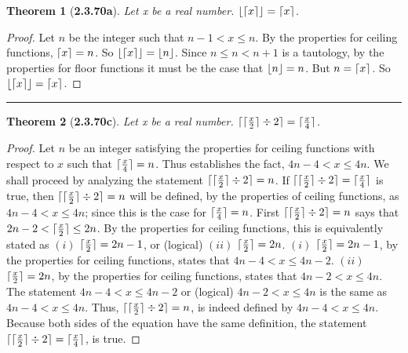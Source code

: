\documentclass[a4paper, 12pt]{article}
\theoremstyle{plain}
\newtheorem*{theorem*}{Theorem}
\DeclarePairedDelimiter{\floor}{\lfloor}{\rfloor}
\DeclarePairedDelimiter{\ceil}{\lceil}{\rceil}
\begin{document}
\pagebreak

\begin{theorem*}[\textbf{2.3.70a}]
    Let x be a real number. $\floor{\ceil{x}} = \ceil{x}$.
\end{theorem*}

\begin{proof}
    Let $n$ be the integer such that $n - 1 < x \le n$. By the properties for ceiling 
    functions, $\ceil{x} = n$. So $\floor{\ceil{x}} = \floor{n}$. Since $n \le n < n + 1$ is 
    a tautology, by the properties for floor functions it must be the case that 
    $\floor{n} = n$. But $n = \ceil{x}$. So $\floor{\ceil{x}} = \ceil{x}$.
\end{proof}
\begin{center}
    \rule{5.4in}{1pt}
\end{center}


\begin{theorem*}[\textbf{2.3.70c}]
    Let x be a real number. $\ceil{\ceil{\frac{x}{2}} \div 2} = \ceil{\frac{x}{4}}$.
\end{theorem*}

\begin{proof}
    Let $n$ be an integer satisfying the properties for ceiling functions with respect to $x$ 
    such that $\ceil{\frac{x}{4}} = n$. Thus establishes the fact, $4n - 4 < x \le 4n$. We 
    shall proceed by analyzing the statement $\ceil{\ceil{\frac{x}{2}} \div 2} = n$. If 
    $\ceil{\ceil{\frac{x}{2}} \div 2} = \ceil{\frac{x}{4}}$ is true, then 
    $\ceil{\ceil{\frac{x}{2}} \div 2} = n$ will be defined, by the properties of ceiling 
    functions, as $4n - 4 < x \le 4n$; since this is the case for $\ceil{\frac{x}{4}} = n$.
    \newline
    \newline
    First $\ceil{\ceil{\frac{x}{2}} \div 2} = n$ says that $2n - 2 < \ceil{\frac{x}{2}} \le 2n$. 
    By the properties for ceiling functions, this is equivalently stated as 
    $(i)$ $\ceil{\frac{x}{2}} = 2n - 1$, or (logical) $(ii)$ $\ceil{\frac{x}{2}} = 2n$.
    \newline
    \newline
    \indent $(i)$ $\ceil{\frac{x}{2}} = 2n - 1$, by the properties for ceiling functions, states 
    that \indent $4n - 4 < x \le 4n - 2$.
    \newline
    \newline
    \indent $(ii)$ $\ceil{\frac{x}{2}} = 2n$, by the properties for ceiling functions, states 
    that \newline \indent $4n - 2 < x \le 4n$.
    \newline
    \newline
    The statement $4n - 4 < x \le 4n - 2$ or (logical) $4n - 2 < x \le 4n$ is the same as 
    $4n - 4 < x \le 4n$. Thus, $\ceil{\ceil{\frac{x}{2}} \div 2} = n$, is indeed defined by 
    $4n - 4 < x \le 4n$. Because both sides of the equation have the same definition, the statement 
    $\ceil{\ceil{\frac{x}{2}} \div 2} = \ceil{\frac{x}{4}}$, is true.
\end{proof}
\end{document}
